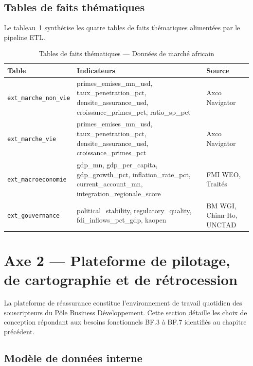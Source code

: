 \documentclass[12pt,a4paper]{report}
\begin{document}
\subsection{Tables de faits thématiques}

Le tableau~\ref{tab:tables_faits} synthétise les quatre tables de faits thématiques alimentées par le pipeline ETL.

\begin{table}[H]
\centering
\caption{Tables de faits thématiques --- Données de marché africain}
\label{tab:tables_faits}
\small
\begin{tabularx}{\textwidth}{@{}p{3.5cm}p{5cm}X@{}}
\toprule
\textbf{Table} & \textbf{Indicateurs} & \textbf{Source} \\
\midrule
\texttt{ext\_marche\_non\_vie} & primes\_emises\_mn\_usd, taux\_penetration\_pct, densite\_assurance\_usd, croissance\_primes\_pct, ratio\_sp\_pct & Axco Navigator \\
\midrule
\texttt{ext\_marche\_vie} & primes\_emises\_mn\_usd, taux\_penetration\_pct, densite\_assurance\_usd, croissance\_primes\_pct & Axco Navigator \\
\midrule
\texttt{ext\_macroeconomie} & gdp\_mn, gdp\_per\_capita, gdp\_growth\_pct, inflation\_rate\_pct, current\_account\_mn, integration\_regionale\_score & FMI WEO, Traités \\
\midrule
\texttt{ext\_gouvernance} & political\_stability, regulatory\_quality, fdi\_inflows\_pct\_gdp, kaopen & BM WGI, Chinn-Ito, UNCTAD \\
\bottomrule
\end{tabularx}
\end{table}


\section{Axe 2 --- Plateforme de pilotage, de cartographie et de rétrocession}

La plateforme de réassurance constitue l'environnement de travail quotidien des souscripteurs du Pôle Business Développement. Cette section détaille les choix de conception répondant aux besoins fonctionnels BF.3 à BF.7 identifiés au chapitre précédent.

\subsection{Modèle de données interne}
\end{document}
